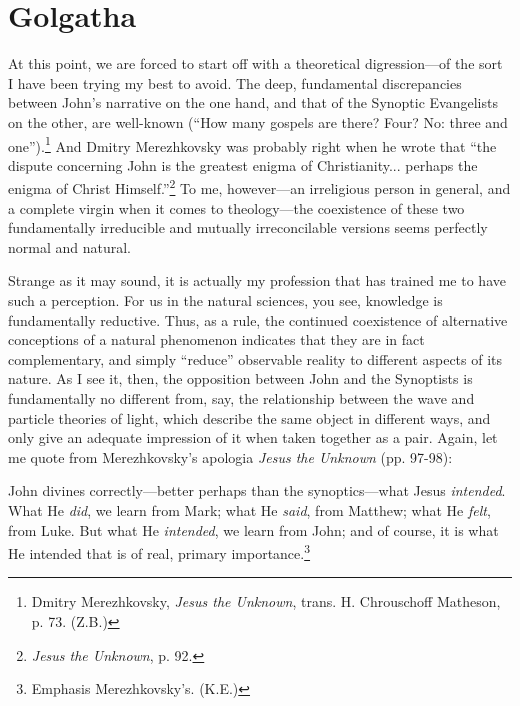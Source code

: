 \chapter*[(First Warning to McDowell)]{Golgatha}

At this point, we are forced to start off with a theoretical digression---of the sort I have been trying my best to avoid. The deep, fundamental discrepancies between John's narrative on the one hand, and that of the Synoptic Evangelists on the other, are well-known (``How many gospels are there? Four? No: three and one'').\footnote{ Dmitry Merezhkovsky, \emph{Jesus the Unknown}, trans. H. Chrouschoff Matheson, p. 73. (Z.B.)} And Dmitry Merezhkovsky was probably right when he wrote that ``the dispute concerning John is the greatest enigma of Christianity... perhaps the enigma of Christ Himself.''\footnote{\emph{Jesus the Unknown}, p. 92.} To me, however---an irreligious person in general, and a complete virgin when it comes to theology---the coexistence of these two fundamentally irreducible and mutually irreconcilable versions seems perfectly normal and natural.

Strange as it may sound, it is actually my profession that has trained me to have such a perception. For us in the natural sciences, you see, knowledge is fundamentally reductive. Thus, as a rule, the continued coexistence of alternative conceptions of a natural phenomenon indicates that they are in fact complementary, and simply ``reduce'' observable reality to different aspects of its nature. As I see it, then, the opposition between John and the Synoptists is fundamentally no different from, say, the relationship between the wave and particle theories of light, which describe the same object in different ways, and only give an adequate impression of it when taken together as a pair. Again, let me quote from Merezhkovsky's apologia \emph{Jesus the Unknown} (pp. 97-98):

\begin{smallquote}
    John divines correctly---better perhaps than the synoptics---what Jesus \emph{intended}. What He \emph{did}, we learn from Mark; what He \emph{said}, from Matthew; what He \emph{felt}, from Luke. But what He \emph{intended}, we learn from John; and of course, it is what He intended that is of real, primary importance.\footnote{Emphasis Merezhkovsky's. (K.E.)}
\end{smallquote}

